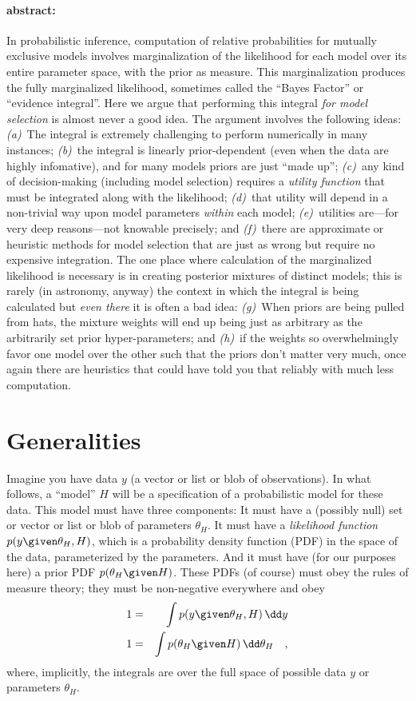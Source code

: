 \documentclass[12pt,twoside]{article}
\begin{document}
\paragraph{abstract:}
In probabilistic inference,
  computation of relative probabilities for mutually exclusive models
  involves marginalization of the likelihood for each model
  over its entire parameter space,
  with the prior as measure.
This marginalization produces the fully marginalized likelihood,
  sometimes called the ``Bayes Factor'' or ``evidence integral''.
Here we argue that performing this integral \emph{for model selection}
  is almost never a good idea.
The argument involves the following ideas:
  \textsl{(a)}~The integral is extremely challenging to perform numerically in many instances;
  \textsl{(b)}~the integral is linearly prior-dependent (even when the data are highly infomative),
  and for many models priors are just ``made up'';
  \textsl{(c)}~any kind of decision-making (including model selection) requires a \emph{utility function}
  that must be integrated along with the likelihood;
  \textsl{(d)}~that utility will depend in a non-trivial way upon model parameters \emph{within} each model;
  \textsl{(e)}~utilities are---for very deep reasons---not knowable precisely; and
  \textsl{(f)}~there are approximate or heuristic methods for model selection
  that are just as wrong but require no expensive integration.
The one place where calculation of the marginalized likelihood is necessary
  is in creating posterior mixtures of distinct models;
  this is rarely (in astronomy, anyway) the context in which the integral is being calculated
  but \emph{even there} it is often a bad idea:
  \textsl{(g)}~When priors are being pulled from hats,
  the mixture weights will end up being just as arbitrary as the arbitrarily set prior hyper-parameters; and
  \textsl{(h)}~if the weights so overwhelmingly favor one model over the other
  such that the priors don't matter very much,
  once again there are heuristics that could have told you that reliably with much less computation.

\section{Generalities}

Imagine you have data $y$ (a vector or list or blob of observations).
In what follows, a ``model'' $H$ will be a specification of a probabilistic model for these data.
This model must have three components:
It must have a (possibly null) set or vector or list or blob of parameters $\theta_H$.
It must have a \emph{likelihood function} $p(y\given\theta_H,H)$, which is
  a probability density function (PDF) in the space of the data, parameterized by the parameters.
And it must have (for our purposes here) a prior PDF $p(\theta_H\given H)$.
These PDFs (of course) must obey the rules of measure theory;
  they must be non-negative everywhere and obey
\begin{eqnarray}
1 &=& \int p(y\given\theta_H,H)\,\dd y
\\
1 &=& \int p(\theta_H\given H)\,\dd \theta_H
\quad ,
\end{eqnarray}
where, implicitly,
the integrals are over the full space of possible data $y$ or parameters $\theta_H$.
\end{document}
